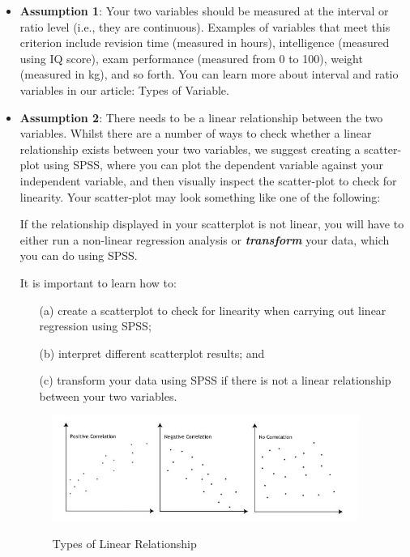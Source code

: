 \documentclass[11pt]{article} %
\begin{document}
\begin{itemize}
\item \textbf{Assumption 1}: Your two variables should be measured at the interval or ratio level (i.e., they are continuous). Examples of variables that meet this criterion include revision time (measured in hours), intelligence (measured using IQ score), exam performance (measured from 0 to 100), weight (measured in kg), and so forth. You can learn more about interval and ratio variables in our article: Types of Variable.

\item \textbf{Assumption 2}: There needs to be a linear relationship between the two variables. Whilst there are a number of ways to check whether a linear relationship exists between your two variables, we suggest creating a scatter-plot using SPSS, where you can plot the dependent variable against your independent variable, and then visually inspect the scatter-plot to check for linearity. Your scatter-plot may look something like one of the following:

If the relationship displayed in your scatterplot is not linear, you will have to either run a non-linear regression analysis or \textbf{\textit{transform}} your data, which you can do using SPSS.

 It is important to learn how to:
\begin{itemize} 
\item[(a)] create a scatterplot to check for linearity when carrying out linear regression using SPSS; 
\item[(b)] interpret different scatterplot results; and \item[(c)] transform your data using SPSS if there is not a linear relationship between your two variables.
\end{itemize}

\begin{figure}[h!]
\begin{centering}
  \includegraphics[width=10cm]{Regre1.jpg}\\
  \caption{Types of Linear Relationship}
\end{centering}
\end{figure}


\end{itemize}
\end{document}
